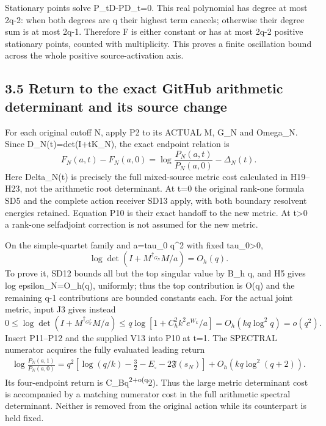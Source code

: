 Stationary points solve P\_tD-PD\_t=0. This real polynomial has degree at most 2q-2: when both degrees are q their highest term cancels; otherwise their degree sum is at most 2q-1. Therefore F is either constant or has at most 2q-2 positive stationary points, counted with multiplicity. This proves a finite oscillation bound across the whole positive source-activation axis.

\subsection{3.5 Return to the exact GitHub arithmetic determinant and its source change}\label{return-to-the-exact-github-arithmetic-determinant-and-its-source-change}

For each original cutoff N, apply P2 to its ACTUAL M, G\_N and Omega\_N. Since D\_N(t)=det(I+tK\_N), the exact endpoint relation is \[
 \boxed{F_N(a,t)-F_N(a,0)
 =\log\frac{P_N(a,t)}{P_N(a,0)}-\Delta_N(t).}\tag{P10}
\] Here Delta\_N(t) is precisely the full mixed-source metric cost calculated in H19--H23, not the arithmetic root determinant. At t=0 the original rank-one formula SD5 and the complete action receiver SD13 apply, with both boundary resolvent energies retained. Equation P10 is their exact handoff to the new metric. At t\textgreater0 a rank-one selfadjoint correction is not assumed for the new metric.

On the simple-quartet family and a=tau\_0 q\^{}2 with fixed tau\_0\textgreater0, \[
 \log\det(I+M^{\dagger_{G_N}}M/a)=O_h(q).
 \tag{P11}
\] To prove it, SD12 bounds all but the top singular value by B\_h q, and H5 gives log epsilon\_N=O\_h(q), uniformly; thus the top contribution is O(q) and the remaining q-1 contributions are bounded constants each. For the actual joint metric, input J3 gives instead \[
 0\le\log\det(I+M^{\dagger_{G_N^J}}M/a)
 \le q\log[1+C_h^2k^2e^{W_k}/a]
 =O_h(kq\log^2q)=o(q^2).
 \tag{P12}
\] Insert P11--P12 and the supplied V13 into P10 at t=1. The SPECTRAL numerator acquires the fully evaluated leading return \[
 \boxed{\begin{aligned}
 \log\frac{P_N(a,1)}{P_N(a,0)}
 =q^2[\log(q/k)-\tfrac32-E_\square-2\mathfrak F(s_N)]
 +O_h(kq\log^2(q+2)).
 \end{aligned}}\tag{P13}
\] Its four-endpoint return is C\_Bq\textsuperscript{2+o(q}2). Thus the large metric determinant cost is accompanied by a matching numerator cost in the full arithmetic spectral determinant. Neither is removed from the original action while its counterpart is held fixed.

